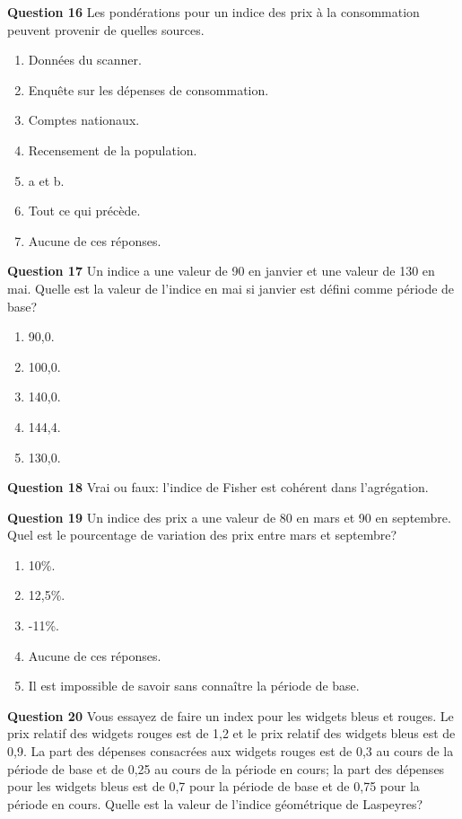 \documentclass[]{article}
\begin{document}
\textbf{Question 16} Les pondérations pour un indice des prix à la consommation peuvent provenir de quelles sources.

\begin{enumerate}
\def\labelenumi{\alph{enumi})}
\item
  Données du scanner.
\item
  Enquête sur les dépenses de consommation.
\item
  Comptes nationaux.
\item
  Recensement de la population.
\item
  a et b.
\item
  Tout ce qui précède.
\item
  Aucune de ces réponses.
\end{enumerate}

\textbf{Question 17} Un indice a une valeur de 90 en janvier et une valeur de 130 en mai. Quelle est la valeur de l'indice en mai si janvier est défini comme période de base?

\begin{enumerate}
\def\labelenumi{\alph{enumi})}
\item
  90,0.
\item
  100,0.
\item
  140,0.
\item
  144,4.
\item
  130,0.
\end{enumerate}

\textbf{Question 18} Vrai ou faux: l'indice de Fisher est cohérent dans l'agrégation.

\textbf{Question 19} Un indice des prix a une valeur de 80 en mars et 90 en septembre. Quel est le pourcentage de variation des prix entre mars et septembre?

\begin{enumerate}
\def\labelenumi{\alph{enumi})}
\item
  10\%.
\item
  12,5\%.
\item
  -11\%.
\item
  Aucune de ces réponses.
\item
  Il est impossible de savoir sans connaître la période de base.
\end{enumerate}

\textbf{Question 20} Vous essayez de faire un index pour les widgets bleus et rouges. Le prix relatif des widgets rouges est de 1,2 et le prix relatif des widgets bleus est de 0,9. La part des dépenses consacrées aux widgets rouges est de 0,3 au cours de la période de base et de 0,25 au cours de la période en cours; la part des dépenses pour les widgets bleus est de 0,7 pour la période de base et de 0,75 pour la période en cours. Quelle est la valeur de l'indice géométrique de Laspeyres?
\end{document}
